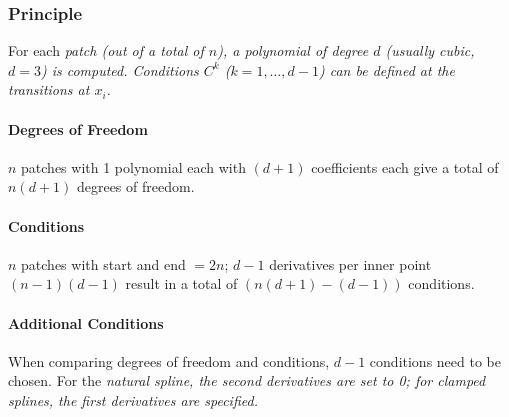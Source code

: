\subsubsection{Principle}
For each \em patch \em (out of a total of $n$), a polynomial of degree $d$ (usually cubic, $d=3$) is computed.
Conditions $C^k$ ($k=1,\ldots, d-1$) can be defined at the transitions at $x_i$.

\paragraph{Degrees of Freedom}
$n$ patches with 1 polynomial each with $(d+1)$ coefficients each give a total of $n(d+1)$ degrees of freedom.

\paragraph{Conditions}
$n$ patches with start and end $=2n$;
$d-1$ derivatives per inner point $(n-1)(d-1)$ result in a total of $(n(d+1)-(d-1))$ conditions.

\paragraph{Additional Conditions}
When comparing degrees of freedom and conditions, $d-1$ conditions need to be chosen. For the \em natural
spline, \em the second derivatives are set to 0; for \em clamped splines,
\em the first derivatives are specified.


